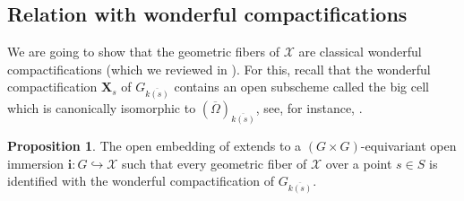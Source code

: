 \documentclass[11pt, reqno]{amsart}
\theoremstyle{plain}
\theoremstyle{definition}
\newtheorem{proposition}[theorem]{Proposition}
\begin{document}
\subsection{Relation with wonderful compactifications}\label{relationwithwonder}
We are going to show that the geometric fibers of $\mathcal{X}$ are classical wonderful compactifications (which we reviewed in ). For this, recall that the wonderful compactification $\mathbf{X}_s$ of $G_{\overline{k(s)}}$ contains an open subscheme called the big cell which is canonically isomorphic to $(\overline{\Omega})_{\overline{k(s)}}$, see, for instance, \cite[Proposition~6.1.7]{BrionKumar}.

\begin{proposition}\label{groupembedtocompac}
    The open embedding of  extends to 
    a $(G\times G)$-equivariant open immersion $\mathbf{i}\colon G\hookrightarrow\mathcal{X}$    
    such that every geometric fiber of $\mathcal{X}$ over a point $s\in S$ is identified with the wonderful compactification of $G_{\overline{k(s)}}$. 
\end{proposition}
    
\end{document}
